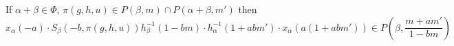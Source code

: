\documentclass[oneside, 8pt]{amsart}
\theoremstyle{remark}
\theoremstyle{definition}
\numberwithin{equation}{section}
\begin{document}
If $\alpha + \beta \in \Phi$, $\pi(g, h, u) \in P(\beta, m) \cap P(\alpha + \beta, m')$ then
\[x_\alpha(-a) \cdot S_\beta(-b, \pi(g, h, u)) h_{\beta}^{-1}(1-bm)\cdot h_{\alpha}^{-1}(1 + abm')\cdot x_{\alpha}(a(1 + abm')) \in P\left(\beta, \frac{m + am'}{1-bm}\right)\]

\begin{comment}
($\alpha = 21$, $\beta = 1r$, $\alpha + \beta = 2r$)
($\alpha = 21$, $\beta = 13$, $\alpha + \beta = 23$)
\begin{multline}
\left(\begin{array}{ccc} 
 1 & 0 & -bX^{-1} \\
 0 & 1 & 0 \\
 0 & 0 & 1 
 \end{array}\right)
\left(\begin{array}{ccc} 
 1 & 0 & * \\
 0 & 1 & * \\
 mX & m'X & 1 
 \end{array}\right)
 \left(\begin{array}{ccc} 
 1 & 0 & \frac{bX^{-1}}{1 - bm} \\
 0 & 1 & 0 \\
 0 & 0 & 1 
 \end{array}\right) = 
 \left(\begin{array}{ccc} 
 1 - bm & -bm' & * \\
 0 & 1 & * \\
 mX & m'X & (1 - mb)^{-1} 
 \end{array}\right) = S_\beta(-b, g^+).
\end{multline}
\begin{multline}
\left(\begin{array}{ccc} 
 1 & 0 & 0 \\
 -a & 1 & 0 \\
 0 & 0 & 1 
 \end{array}\right)
 \left(\begin{array}{ccc} 
 1 - bm & - bm' & * \\
 0 & 1 & * \\
 mX & m'X & (1 - bm)^{-1} 
 \end{array}\right) = 
 \left(\begin{array}{ccc} 
 1 - bm & - bm' & * \\
 - a + abm & 1 + abm' & * \\
 mX & m'X & (1 - bm)^{-1} 
 \end{array}\right) = x_\alpha(-a) \cdot S_\beta(-b, g^+)
\end{multline}

\end{comment}
\end{document}
